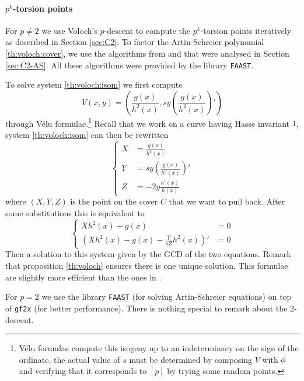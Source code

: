 \paragraph{$p^k$-torsion points}
For $p\ne2$ we use Voloch's $p$-descent to compute the $p^k$-torsion
points iteratively as described in Section \ref{sec:C2}. To factor the
Artin-Schreier polynomial \eqref{th:voloch:cover}, we use the
algorithms from \cite{Cou00} and \cite{DFS09} that were analysed in
Section \ref{sec:C2-AS}. All these algorithms were provided by the
library \texttt{FAAST}.

To solve system \eqref{th:voloch:isom} we first compute
\begin{equation*}
  V(x,y) = \left(\frac{g(x)}{h^2(x)}, 
    sy\left(\frac{g(x)}{h^2(x)}\right)'\right)
\end{equation*}
through Vélu formulae.\footnote{Vélu formulae compute this isogeny up
  to an indeterminacy on the sign of the ordinate, the actual value of
  $s$ must be determined by composing $V$ with $\phi$ and
  verifying that it corresponds to $[p]$ by trying some random
  points.} Recall that we work on a curve having Hasse invariant $1$,
system \eqref{th:voloch:isom} can then be rewritten
\begin{equation*}
  \left\{
    \begin{aligned}
      X &= \frac{g(x)}{h^2(x)}\\
      Y &= sy\left(\frac{g(x)}{h^2(x)}\right)'\\
      Z &= -2y\frac{h'(x)}{h(x)}
    \end{aligned}
  \right.
\end{equation*}
where $(X,Y,Z)$ is the point on the cover $C$ that we want to pull
back. After some substitutions this is equivalent to
\begin{equation*}
  \left\{
    \begin{aligned}
      Xh^2(x) - g(x) &= 0\\
      \left(Xh^2(x) - g(x) - \frac{Y}{sZ}h^2(x)\right)' &= 0
    \end{aligned}
  \right.
\end{equation*}
Then a solution to this system given by the GCD of the two
equations. Remark that proposition \ref{th:voloch} ensures there is
one unique solution. This formulae are slightly more efficient than
the ones in \cite[$\S$6.2]{Ler97}.

For $p=2$ we use the library \texttt{FAAST} (for solving
Artin-Schreier equations) on top of \texttt{gf2x} (for better
performance). There is nothing special to remark about the
$2$-descent.



